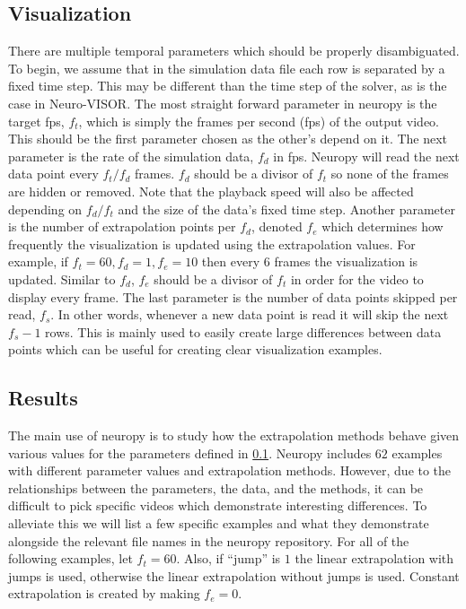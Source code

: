 \subsection{Visualization}%
\label{sub:visualization}
There are multiple temporal parameters which should be properly disambiguated.
To begin, we assume that in the simulation data file each row is separated by a fixed time step.
This may be different than the time step of the solver, as is the case in Neuro-VISOR.
The most straight forward parameter in neuropy is the target fps, $f_t$, which is simply the frames per second (fps) of the output video.
This should be the first parameter chosen as the other's depend on it.
The next parameter is the rate of the simulation data, $f_d$ in fps.
Neuropy will read the next data point every $f_t / f_d$ frames.
$f_d$ should be a divisor of $f_t$ so none of the frames are hidden or removed.
Note that the playback speed will also be affected depending on $f_d / f_t$ and the size of the data's fixed time step.
Another parameter is the number of extrapolation points per $f_d$, denoted $f_e$ which determines how frequently the visualization is updated using the extrapolation values.
For example, if $f_t=60,f_d=1,f_e=10$ then every $6$ frames the visualization is updated.
Similar to $f_d$, $f_e$ should be a divisor of $f_t$ in order for the video to display every frame.
The last parameter is the number of data points skipped per read, $f_s$.
In other words, whenever a new data point is read it will skip the next $f_s - 1$ rows.
This is mainly used to easily create large differences between data points which can be useful for creating clear visualization examples.

\subsection{Results}%
\label{sub:results}
The main use of neuropy is to study how the extrapolation methods behave given various values for the parameters defined in \cref{sub:visualization}.
Neuropy includes $62$ examples with different parameter values and extrapolation methods.
However, due to the relationships between the parameters, the data, and the methods, it can be difficult to pick specific videos which demonstrate interesting differences.
To alleviate this we will list a few specific examples and what they demonstrate alongside the relevant file names in the neuropy repository\cite{neuropy}.
For all of the following examples, let $f_t=60$.
Also, if ``jump'' is $1$ the linear extrapolation with jumps is used, otherwise the linear extrapolation without jumps is used.
Constant extrapolation is created by making $f_e = 0$. 

